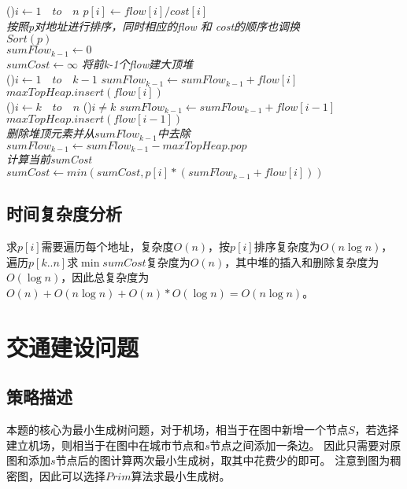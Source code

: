 \begin{algorithm}[H]
    \caption{$minCost(flow[1..n], cost[1..n], k)$}\label{algo:minCost}
    \For(){$i \leftarrow 1 \quad to \quad n$}{
        $p[i] \leftarrow flow[i] / cost[i]$\\
    }
    \emph{按照p对地址进行排序，同时相应的flow 和 cost的顺序也调换}\\
    $Sort(p)$\\
    $sumFlow_{k-1} \leftarrow 0$\\
    $sumCost \leftarrow \infty$
    \emph{将前k-1个flow建大顶堆}\\
    \For(){$i \leftarrow 1 \quad to \quad k-1$}{
        $sumFlow_{k-1} \leftarrow sumFlow_{k-1} + flow[i]$\\
        $maxTopHeap.insert(flow[i])$\\
    }
    \For(){$i \leftarrow k \quad to \quad n$}{
        \If(){$i \ne k$}{
            $sumFlow_{k-1} \leftarrow sumFlow_{k-1} + flow[i-1]$\\
            $maxTopHeap.insert(flow[i-1])$\\
            \emph{删除堆顶元素并从$sumFlow_{k-1}$中去除}\\
            $sumFlow_{k-1} \leftarrow sumFlow_{k-1} - maxTopHeap.pop$\\
        }
        \emph{计算当前sumCost}\\
        $sumCost \leftarrow min(sumCost, p[i]*(sumFlow_{k-1} + flow[i]))$\\
    }
\end{algorithm}

\subsection{时间复杂度分析}
求$p[i]$需要遍历每个地址，复杂度$O(n)$，按$p[i]$排序复杂度为$O(n \log n)$，遍历$p[k..n]$求$\min sumCost$复杂度为$O(n)$，其中堆的插入和删除复杂度为$O(\log n)$，因此总复杂度为$O(n)+O(n\log n) + O(n) * O(\log n) = O(n \log n)$。


\section{交通建设问题}

\subsection{策略描述}
本题的核心为最小生成树问题，对于机场，相当于在图中新增一个节点$S$，若选择建立机场，则相当于在图中在城市节点和$s$节点之间添加一条边。
因此只需要对原图和添加$s$节点后的图计算两次最小生成树，取其中花费少的即可。
注意到图为稠密图，因此可以选择$Prim$算法求最小生成树。
